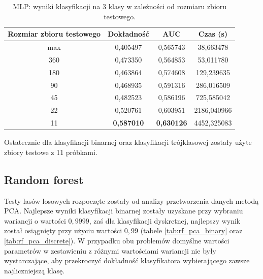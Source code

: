 \documentclass[a4paper, twoside, 11pt, openright]{article}
\begin{document}
\begin{table}[H]
    \centering
    \begin{tabular}{|c|c|c|c|}
    \hline
        \textbf{Rozmiar zbioru testowego} & \textbf{Dokładność} &  \textbf{AUC} &  \textbf{Czas (s)} \\ \hline
max                           &  0,405497 &  0,565743 &   38,663478 \\ \hline
360                         &  0,473350 &  0,564853 &   53,011780 \\ \hline
180                         &  0,463864 &  0,574608 &   129,239635 \\ \hline
90                        &  0,468935 &  0,591316 &   286,016509 \\ \hline
45                          &  0,482523 &  0,586196 &   725,585042 \\ \hline
22                         &  0,520761 &  0,603951 &  2186,040966 \\ \hline
11                          &  \textbf{0,587010} &  \textbf{0,630126} &  4452,325083 \\ \hline

    \end{tabular}
    \caption{MLP: wyniki klasyfikacji na 3 klasy w zależności od rozmiaru zbioru testowego.}
    \label{tab:nn_walk_forward_test_discrete}
\end{table}

Ostatecznie dla klasyfikacji binarnej oraz klasyfikacji trójklasowej zostały użyte zbiory testowe z 11 próbkami.

\subsection{Random forest}

Testy lasów losowych rozpoczęte zostały od analizy przetworzenia danych metodą PCA. Najlepsze wyniki klasyfikacji binarnej zostały uzyskane przy wybraniu wariancji o wartości $0,9999$, zaś dla klasyfikacji dyskretnej, najlepszy wynik został osiągnięty przy użyciu wartości $0,99$ (tabele \ref{tab:rf_pca_binary} oraz \ref{tab:rf_pca_discrete}). W przypadku obu problemów domyślne wartości parametrów w zestawieniu z różnymi wartościami wariancji nie były wystarczające, aby przekroczyć dokładność klasyfikatora wybierającego zawsze najliczniejszą klasę.
\end{document}
